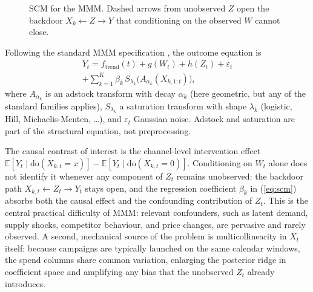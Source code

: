 \documentclass{uai2026} %
\newcommand{\bbE}{\mathbb{E}}
\newcommand{\dosym}{\mathrm{do}}
\begin{document}
\begin{figure}[!tb]
  \centering
  \caption{SCM for the MMM. Dashed arrows from unobserved $Z$ open the backdoor $X_k \leftarrow Z \to Y$ that conditioning on the observed $W$ cannot close.}\label{fig:dag}
\end{figure}
Following the standard MMM specification \citep{jin2017bayesian}, the outcome equation is
\begin{multline}\label{eq:scm}
    Y_t = f_\text{trend}(t) + g(W_t) + h(Z_t) + \varepsilon_t \\
    + \sum_{k=1}^{K} \beta_k\, S_{\lambda_k}\!\bigl(A_{\alpha_k}(X_{k,1:t})\bigr),
\end{multline}
where $A_{\alpha_k}$ is an adstock transform with decay $\alpha_k$ (here geometric, but any of the standard families applies), $S_{\lambda_k}$ a saturation transform with shape $\lambda_k$ (logistic, Hill, Michaelis-Menten, \dots), and $\varepsilon_t$ Gaussian noise.
Adstock and saturation are part of the structural equation, not preprocessing.

The causal contrast of interest is the channel-level intervention effect $\bbE[Y_t \mid \dosym(X_{k,t} = x)] - \bbE[Y_t \mid \dosym(X_{k,t} = 0)]$.
Conditioning on $W_t$ alone does not identify it whenever any component of $Z_t$ remains unobserved: the backdoor path $X_{k,t} \leftarrow Z_t \to Y_t$ stays open, and the regression coefficient $\beta_k$ in (\ref{eq:scm}) absorbs both the causal effect and the confounding contribution of $Z_t$.
This is the central practical difficulty of MMM: relevant confounders, such as latent demand, supply shocks, competitor behaviour, and price changes, are pervasive and rarely observed.
A second, mechanical source of the problem is multicollinearity in $X_t$ itself: because campaigns are typically launched on the same calendar windows, the spend columns share common variation, enlarging the posterior ridge in coefficient space and amplifying any bias that the unobserved $Z_t$ already introduces.
\end{document}
